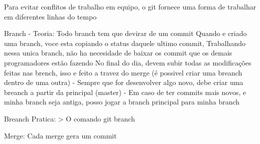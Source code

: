 Para evitar conflitos de trabalho em equipo, o git fornece uma forma de trabalhar em diferentes linhas do tempo

Branch - Teoria: Todo branch tem que devirar de um commit 
Quando e criado uma branch, voce esta copiando o status daquele ultimo commit,
Trabalhando nessa unica branch, não ha necesidade de baixar os commit que os demais programadores estão fazendo
No final do dia, devem subir todas as modificações feitas nas brench, isso e feito a travez do merge
(é possivel criar uma breanch dentro de uma outra)
 - Sempre que for desenvolver algo novo, debe criar uma breanch a partir da principal (master)
 - Em caso de ter commits mais novos, e minha branch seja antiga, posso jogar a branch principal
    para minha branch

Breanch Pratica: 
> O comando git branch 

Merge: Cada merge gera um commit 

 